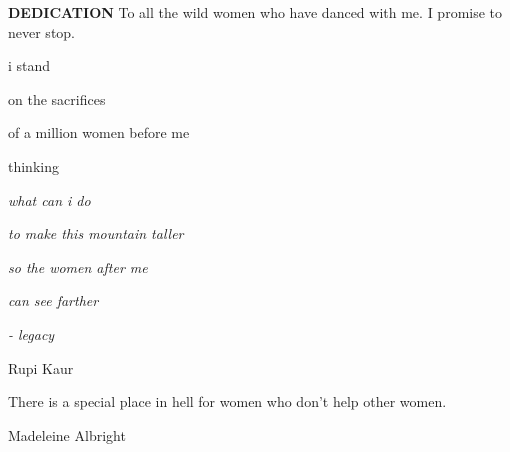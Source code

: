 
\clearpage

\clearpage\thispagestyle{empty}\mbox{}\clearpage 

\begin{center}
{\textbf{DEDICATION}}
\hspace{0pt}
\vfill
To all the wild women who have danced with me. I promise to never stop. 
\vfill


\raggedright{i stand} \\
\raggedright{on the sacrifices} \\
\raggedright{of a million women before me} \\
\raggedright{thinking} \\
\raggedright{\textit{what can i do}} \\
\raggedright{\textit{to make this mountain taller}} \\
\raggedright{\textit{so the women after me}} \\
\raggedright{\textit{can see farther}} \\
\raggedright{\textit{- legacy}} \\
\raggedright{Rupi Kaur}

\vfill
\raggedright{There is a special place in hell for women who don't help other women.} \\
\raggedright{Madeleine Albright}
\vfill
\hspace{0pt}
\end{center}

